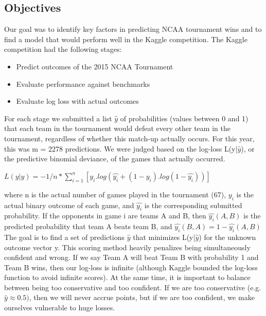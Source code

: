 \documentclass{article}
\begin{document}
    \subsection{Objectives}
    Our goal was to identify key factors in predicting NCAA tournament wins and to find a
model that would perform well in the Kaggle competition.
The Kaggle competition had the following stages:
\begin{itemize}
\item Predict outcomes of the 2015 NCAA Tournament
\item Evaluate performance against benchmarks
\item Evaluate log loss with actual outcomes
\end{itemize}
    For each stage we submitted a list $\hat{y}$ of probabilities (values between 0 and 1) that each team in the tournament would defeat every other team in the tournament, regardless of whether this match-up actually occurs. For this year, this was m = 2278 predictions. We were judged based on the log-loss L(y|$\hat{y}$), or the predictive binomial deviance, of the games that actually occurred.
   
    \begin{center}
    $L(y|\hat{y}) = -1/n * \sum_{i=1}^{n}[y_i.log(\hat{y_i} + (1-y_i). log(1-\hat{y_i}))]$ 
    \end{center}
    
    where n is the actual number of games played in the tournament (67), $y_i$ is the actual binary outcome of each game, and $\hat{y_i}$ is the corresponding submitted probability. If the opponents in game i are teams A and B, then $\hat{y_i}(A,B)$ is the predicted probability that team A beats team B, and $\hat{y_i}(B,A)=1-\hat{y_i}(A,B)$
   \linebreak
   \linebreak
   The goal is to find a set of predictions $\hat{y}$ that minimizes L(y|$\hat{y}$) for the unknown outcome vector y. This scoring method heavily penalizes being simultaneously confident and wrong. If we say Team A will beat Team B with probability 1 and Team B wins, then our log-loss is infinite (although Kaggle bounded the log-loss function to avoid infinite scores). At the same time, it is important to balance between being too conservative and too confident. If we are too conservative (e.g. $\hat{y} \approx 0.5)$, then we will never accrue points, but if we are too confident, we make ourselves vulnerable to huge losses.\cite{1}
   \newline
\end{document}
